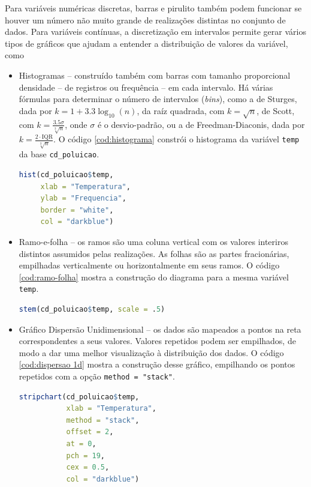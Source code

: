 Para variáveis numéricas discretas, barras e pirulito também podem funcionar se houver
um número não muito grande de realizações distintas no conjunto de dados.
Para variáveis contínuas, a discretização em intervalos permite gerar vários tipos de
gráficos que ajudam a entender a distribuição de valores da variável, como

\begin{itemize}
\item Histogramas -- construído também com barras com tamanho proporcional densidade
-- de registros ou frequência -- em cada intervalo. Há várias fórmulas para determinar
o número de intervalos (\textit{bins}), como a de Sturges, dada por
$k = 1 + 3.3 \log_{10}(n)$, da raíz quadrada, com $k = \sqrt{n}$, de Scott, com
$k = \frac{3.5 \sigma}{\sqrt[3]{n}}$, onde $\sigma$ é o desvio-padrão, ou a de
Freedman-Diaconis, dada por $k = \frac{2 \cdot \mathrm{IQR}}{\sqrt[3]{n}}$.
O código \ref{cod:histograma} constrói o histograma da variável \texttt{temp} da base
\texttt{cd\_poluicao}.

\begin{lstlisting}[language=R, caption={Histograma}, label={cod:histograma}]
hist(cd_poluicao$temp,
     xlab = "Temperatura",
     ylab = "Frequencia",
     border = "white",
     col = "darkblue")
\end{lstlisting}

\item Ramo-e-folha -- os ramos são uma coluna vertical com os valores interiros
distintos assumidos pelas realizações.
As folhas são as partes fracionárias, empilhadas verticalmente ou horizontalmente em seus
ramos.
O código \ref{cod:ramo-folha} mostra a construção do diagrama para a mesma variável
\texttt{temp}.

\begin{lstlisting}[language=R, caption={Ramo-e-folha}, label={cod:ramo-folha}]
stem(cd_poluicao$temp, scale = .5)
\end{lstlisting}

\item Gráfico Dispersão Unidimensional -- os dados são mapeados a pontos na reta
correspondentes a seus valores.
Valores repetidos podem ser empilhados, de modo a dar uma melhor visualização à distribuição
dos dados.
O código \ref{cod:dispersao 1d} mostra a construção desse gráfico, empilhando os pontos
repetidos com a opção \texttt{method = "stack"}.

\begin{lstlisting}[language=R, caption={Dispersão Unidimensional}, label={cod:dispersao 1d}]
stripchart(cd_poluicao$temp,
           xlab = "Temperatura",
           method = "stack",
           offset = 2,
           at = 0,
           pch = 19,
           cex = 0.5,
           col = "darkblue")
\end{lstlisting}
\end{itemize}
